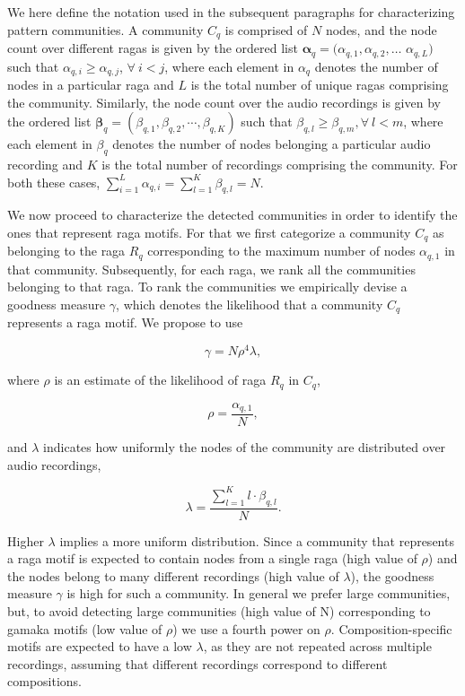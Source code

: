 We here define the notation used in the subsequent paragraphs for characterizing pattern communities. A community $C_q$ is comprised of $N$ nodes, and the node count over different \glspl{raga} is given by the ordered list ${\boldsymbol{\alpha}_q} = (\alpha_{q,1}, \alpha_{q,2},\dots$ $\alpha_{q,L})$ such that $\alpha_{q,i} \geq \alpha_{q,j}$, $\forall~ i < j$,
where each element in $\alpha_{q}$ denotes the number of nodes in a particular \gls{raga} and $L$ is the total number of unique \glspl{raga} comprising the community. Similarly, the node count over the audio recordings is given by the ordered list ${\boldsymbol{\beta}_q} = (\beta_{q,1}, \beta_{q,2},\cdots,\beta_{q,K})$ such that $\beta_{q,l} \geq \beta_{q,m}, \forall~l < m$,  where each element in $\beta_{q}$ denotes the number of nodes belonging a particular audio recording and $K$ is the total number of recordings comprising the community. For both these cases, $\sum_{i=1}^{L}\alpha_{q,i} = \sum_{l=1}^{K}\beta_{q,l} = N$.

We now proceed to characterize the detected communities in order to identify the ones that represent \gls{raga} motifs. For that we first categorize a community $C_q$ as belonging to the \gls{raga} $R_q$ corresponding to the maximum number of nodes $\alpha_{q,1}$ in that community. Subsequently, for each \gls{raga}, we rank all the communities belonging to that \gls{raga}. To rank the communities we empirically devise a goodness measure $\gamma$, which denotes the likelihood that a community $C_q$ represents a \gls{raga} motif. We propose to use

\begin{equation}
\gamma = N \rho^4 \lambda,
\label{eq:gamma_pattern_characterization}
\end{equation}

where $\rho$ is an estimate of the likelihood of \gls{raga} $R_q$ in $C_q$, 

\begin{equation}
\rho = \frac{\alpha_{q,1}}{N},
\end{equation}

and $\lambda$ indicates how uniformly the nodes of the community are distributed over audio recordings,

\begin{equation}
\lambda = \frac{\sum_{l=1}^{K}l \cdot \beta_{q,l}}{N}.
\end{equation}

Higher $\lambda$ implies a more uniform distribution. Since a community that represents a \gls{raga} motif is expected to contain nodes from a single \gls{raga} (high value of $\rho$) and the nodes belong to many different recordings (high value of $\lambda$), the goodness measure $\gamma$ is high for such a community. In general we prefer large communities, but, to avoid detecting large communities (high value of N) corresponding to \gls{gamaka} motifs (low value of $\rho$) we use a fourth power on $\rho$. Composition-specific motifs are expected to have a low $\lambda$, as they are not repeated across multiple recordings, assuming that different recordings correspond to different compositions. 


